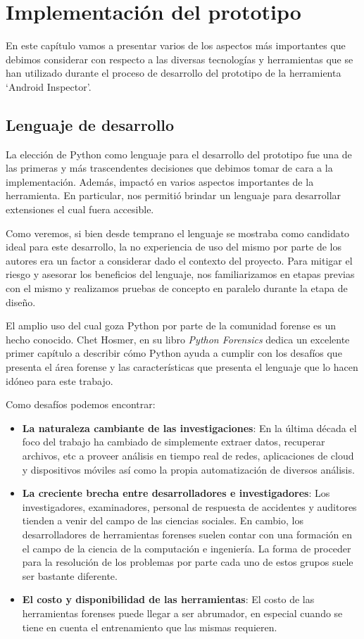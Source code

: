 \chapter{Implementación del prototipo} \label{chap:Implementacion}
En este capítulo vamos a presentar varios de los aspectos más importantes que debimos considerar con respecto a las diversas tecnologías y herramientas que se han utilizado durante el proceso de desarrollo del prototipo de la herramienta \enquote*{Android Inspector}.

\section{Lenguaje de desarrollo}
\label{lenguajeDeDesarrollo}
La elección de Python como lenguaje para el desarrollo del prototipo fue una de las primeras y más trascendentes decisiones que debimos tomar de cara a la implementación. Además, impactó en varios aspectos importantes de la herramienta. En particular, nos permitió brindar un lenguaje para desarrollar extensiones el cual fuera accesible.

Como veremos, si bien desde temprano el lenguaje se mostraba como candidato ideal para este desarrollo, la no experiencia de uso del mismo por parte de los autores era un factor a considerar dado el contexto del proyecto. Para mitigar el riesgo y asesorar los beneficios del lenguaje, nos familiarizamos en etapas previas con el mismo y realizamos pruebas de concepto en paralelo durante la etapa de diseño.

El amplio uso del cual goza Python por parte de la comunidad forense es un hecho conocido. Chet Hosmer, en su libro \emph{Python Forensics} \cite{Hosmer20141} dedica un excelente primer capítulo a describir cómo Python ayuda a cumplir con los desafíos que presenta el área forense y las características que presenta el lenguaje que lo hacen idóneo para este trabajo.

Como desafíos podemos encontrar:

\begin{itemize}
\item \textbf{La naturaleza cambiante de las investigaciones}: En la última década el foco del trabajo ha cambiado de simplemente extraer datos, recuperar archivos, etc a proveer análisis en tiempo real de redes, aplicaciones de cloud y dispositivos móviles así como la propia automatización de diversos análisis.
\item \textbf{La creciente brecha entre desarrolladores e investigadores}: Los investigadores, examinadores, personal de respuesta de accidentes y auditores tienden a venir del campo de las ciencias sociales. En cambio, los desarrolladores de herramientas forenses suelen contar con una formación en el campo de la ciencia de la computación e ingeniería. La forma de proceder para la resolución de los problemas por parte cada uno de estos grupos suele ser bastante diferente.
\item \textbf{El costo y disponibilidad de las herramientas}: El costo de las herramientas forenses puede llegar a ser abrumador, en especial cuando se tiene en cuenta el entrenamiento que las mismas requieren.
\end{itemize}

